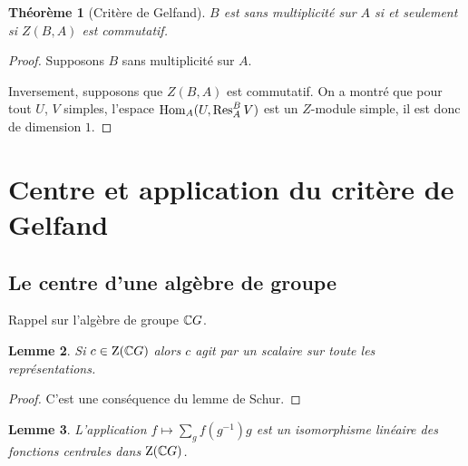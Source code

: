 \documentclass[francais,a4paper,11pt,reqno]{amsart}
\theoremstyle{plain}
\newtheorem{THEO}{\bf Théorème}[section]
\newtheorem{LEMME}[THEO]{\bf Lemme}
\theoremstyle{definition}
\theoremstyle{remark}
\begin{document}
\begin{THEO}[Critère de Gelfand]
  $B$ est sans multiplicité sur $A$ si et seulement si $Z(B, A)$ est
  commutatif.
\end{THEO}
\begin{proof}
  Supposons $B$ sans multiplicité sur $A$. \TODO{}
  
  Inversement, supposons que $Z(B, A)$ est commutatif. On a montré que pour
  tout $U$, $V$ simples, l'espace $\operatorname{Hom}_A(U, \operatorname{Res}^B_A V)$ est un $Z$-module
  simple, il est donc de dimension $1$.
\end{proof}


\section{Centre et application du critère de Gelfand}

\subsection{Le centre d'une algèbre de groupe}

Rappel sur l'algèbre de groupe ${\mathbb C} G$.
\begin{LEMME}
  Si $c\in\operatorname{Z}({\mathbb C} G)$ alors $c$ agit par un scalaire sur toute les
  représentations.
\end{LEMME}
\begin{proof}
  C'est une conséquence du lemme de Schur.
\end{proof}

\begin{LEMME}
  L'application $f\mapsto \sum_g f(g^{-1})g$ est un isomorphisme linéaire
  des fonctions centrales dans $\operatorname{Z}({\mathbb C} G)$.
\end{LEMME}
\end{document}
